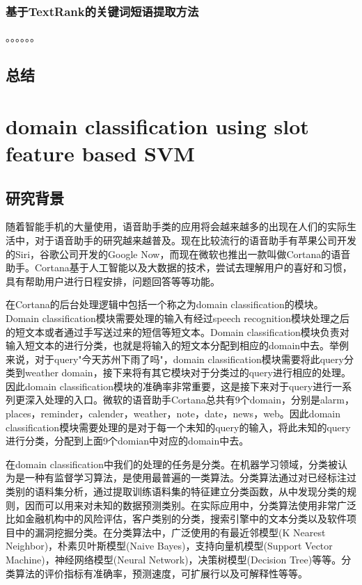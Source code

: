 \documentclass[master]{njuthesis}
\begin{document}
\subsection{基于TextRank的关键词短语提取方法}
    。。。。。。

\section{总结}

\chapter{domain classification using slot feature based SVM}\label{chapter_smallworld}

\section{研究背景}

    随着智能手机的大量使用，语音助手类的应用将会越来越多的出现在人们的实际生活中，对于语音助手的研究越来越普及。现在比较流行的语音助手有苹果公司开发的Siri，谷歌公司开发的Google Now，而现在微软也推出一款叫做Cortana的语音助手。Cortana基于人工智能以及大数据的技术，尝试去理解用户的喜好和习惯，具有帮助用户进行日程安排，问题回答等等功能。

    在Cortana的后台处理逻辑中包括一个称之为domain classification的模块。Domain classification模块需要处理的输入有经过speech recognition模块处理之后的短文本或者通过手写送过来的短信等短文本。Domain classification模块负责对输入短文本的进行分类，也就是将输入的短文本分配到相应的domain中去。举例来说，对于query"今天苏州下雨了吗"，domain classification模块需要将此query分类到weather domain，接下来将有其它模块对于分类过的query进行相应的处理。因此domain classification模块的准确率非常重要，这是接下来对于query进行一系列更深入处理的入口。微软的语音助手Cortana总共有9个domain，分别是alarm，places，reminder，calender，weather，note，date，news，web。因此domain classification模块需要处理的是对于每一个未知的query的输入，将此未知的query进行分类，分配到上面9个domian中对应的domain中去。

    在domain classification中我们的处理的任务是分类。在机器学习领域，分类被认为是一种有监督学习算法，是使用最普遍的一类算法。分类算法通过对已经标注过类别的语料集分析，通过提取训练语料集的特征建立分类函数，从中发现分类的规则，因而可以用来对未知的数据预测类别。在实际应用中，分类算法使用非常广泛比如金融机构中的风险评估，客户类别的分类，搜索引擎中的文本分类以及软件项目中的漏洞挖掘分类。在分类算法中，广泛使用的有最近邻模型(K Nearest Neighbor)，朴素贝叶斯模型(Naive Bayes)，支持向量机模型(Support Vector Machine)，神经网络模型(Neural Network)，决策树模型(Decision Tree)等等。分类算法的评价指标有准确率，预测速度，可扩展行以及可解释性等等。
    
\end{document}
